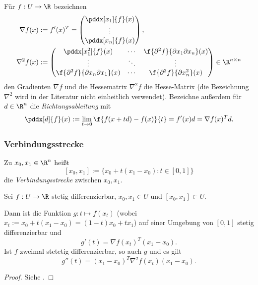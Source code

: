 Für $f: U \to \R$ bezeichnen
\begin{align*}
	\nabla f(x)
	&:= f'(x)^T
	= \begin{pmatrix}
		\pddx[x_1]{f}(x) \\
		\vdots \\
		\pddx[x_n]{f}(x) \\
	\end{pmatrix}, \\
	\nabla^2 f(x)
	&:= \begin{pmatrix}
		\pddx[x_1^2]{f}(x) & \cdots & \f{\partial^2 f}{\partial x_1 \partial x_n}(x) \\
		\vdots & \ddots & \vdots \\
		\f{\partial^2 f}{\partial x_n \partial x_1}(x) & \cdots & \f{\partial^2 f}{\partial x_n^2}(x) \\
	\end{pmatrix} \in \R^{n\times n}
\end{align*}
den Gradienten $\nabla f$ und die Hessematrix $\nabla^2 f$ die Hesse-Matrix
(die Bezeichnung $\nabla^2$ wird in der Literatur nicht einheitlich verwendet).
Bezeichne außerdem für $d \in \R^n$ die \emph{Richtungsableitung} mit
\[
	\pddx[d]{f}(x)
	:= \lim_{t\to 0} \f {f(x+td) - f(x)}{t}
	= f'(x) d = \nabla f(x)^T d.
\]

\subsubsection{Verbindungsstrecke}

\begin{df} \label{2.1}
	Zu $x_0,x_1 \in \R^n$ heißt
	\[
		[x_0, x_1] := \big\{ x_0 + t(x_1-x_0) : t \in [0,1] \big\}
	\]
	die \emph{Verbindungsstrecke} zwischen $x_0, x_1$.
\end{df}

\begin{st} \label{2.2}
	Sei $f: U \to \R$ stetig differenzierbar, $x_0, x_1 \in U$ und $[x_0, x_1] \subset U$.

	Dann ist die Funktion $g: t \mapsto f(x_t)$ (wobei $x_t := x_0 + t(x_1 - x_0) = (1-t) x_0 + tx_1$) auf einer Umgebung von $[0,1]$ stetig differenzierbar und
	\[
		g'(t) = \nabla f(x_t)^T (x_1 - x_0).
	\]
	Ist $f$ zweimal stetetig differenzierbar, so auch $g$ und es gilt
	\[
		g''(t) = (x_1 - x_0)^T \nabla^2 f(x_t) (x_1 - x_0).
	\]
	\begin{proof}
		Siehe .
	\end{proof}
\end{st}

